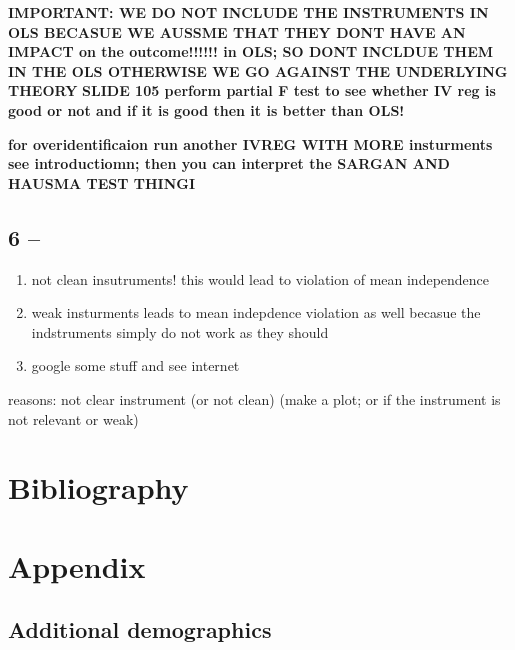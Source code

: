 \documentclass[a4paper]{article}
\begin{document}
\textbf{IMPORTANT: WE DO NOT INCLUDE THE INSTRUMENTS IN OLS BECASUE WE AUSSME THAT THEY DONT HAVE AN IMPACT on the outcome!!!!!! in OLS; SO DONT INCLDUE THEM IN THE OLS OTHERWISE WE GO AGAINST THE UNDERLYING THEORY}
\textbf{SLIDE 105 perform partial F test to see whether IV reg is good or not and if it is good then it is better than OLS!}

\textbf{for overidentificaion run another IVREG WITH MORE insturments see introductiomn; then you can interpret the SARGAN AND HAUSMA TEST THINGI}

\subsection{6 -- }

\begin{enumerate}
   \item not clean insutruments! this would lead to violation of mean independence
   \item weak insturments leads to mean indepdence violation as well becasue the indstruments simply do not work as they should 
   \item google some stuff and see internet
\end{enumerate}



reasons: not clear instrument (or not clean) (make a plot; or if the instrument is not relevant or weak)














\section{Bibliography}






\section{Appendix}
\subsection{Additional demographics}
\end{document}

